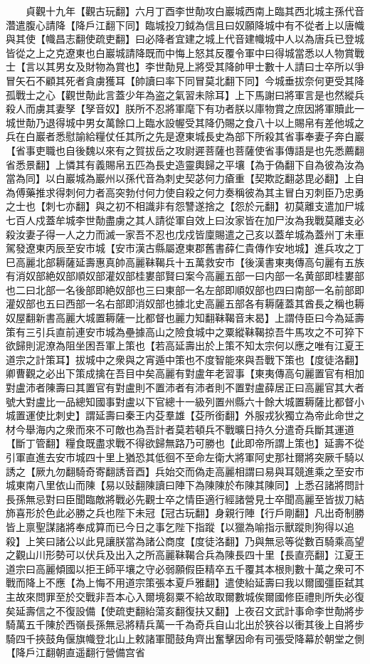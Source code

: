 　　貞觀十九年【觀古玩翻】六月丁酉李世勣攻白巖城西南上臨其西北城主孫代音濳遣腹心請降【降戶江翻下同】臨城投刀鉞為信且曰奴願降城中有不從者上以唐幟與其使【幟昌志翻使疏吏翻】曰必降者宜建之城上代音建幟城中人以為唐兵已登城皆從之上之克遼東也白巖城請降既而中悔上怒其反覆令軍中曰得城當悉以人物賞戰士【言以其男女及財物為賞也】李世勣見上將受其降帥甲士數十人請曰士卒所以爭冒矢石不顧其死者貪虜獲耳【帥讀曰率下同冒莫北翻下同】今城垂拔奈何更受其降孤戰士之心【觀世勣此言蓋少年為盗之氣習未除耳】上下馬謝曰將軍言是也然縱兵殺人而虜其妻孥【孥音奴】朕所不忍將軍麾下有功者朕以庫物賞之庶因將軍贖此一城世勣乃退得城中男女萬餘口上臨水設幄受其降仍賜之食八十以上賜帛有差他城之兵在白巖者悉慰諭給糧仗任其所之先是遼東城長史為部下所殺其省事奉妻子奔白巖【省事吏職也自後魏以來有之賀拔岳之攻尉遲菩薩也菩薩使省事傳語是也先悉薦翻省悉景翻】上憐其有義賜帛五匹為長史造靈輿歸之平壤【為于偽翻下自為彼為汝為當為同】以白巖城為巖州以孫代音為刺史契苾何力瘡重【契欺訖翻苾毘必翻】上自為傅藥推求得刺何力者高突勃付何力使自殺之何力奏稱彼為其主冒白刃刺臣乃忠勇之士也【刺七亦翻】與之初不相識非有怨讐遂捨之【怨於元翻】初莫離支遣加尸城七百人戍蓋牟城李世勣盡虜之其人請從軍自效上曰汝家皆在加尸汝為我戰莫離支必殺汝妻子得一人之力而滅一家吾不忍也戊戍皆廩賜遣之己亥以蓋牟城為蓋州丁未車駕發遼東丙辰至安市城【安市漢古縣屬遼東郡舊書薛仁貴傳作安地城】進兵攻之丁巳高麗北部耨薩延壽惠真帥高麗靺鞨兵十五萬救安市【後漢書東夷傳高句麗有五族有消奴部絶奴部順奴部灌奴部桂婁部賢曰案今高麗五部一曰内部一名黄部即桂婁部也二曰北部一名後部即絶奴部也三曰東部一名左部即順奴部也四曰南部一名前部即灌奴部也五曰西部一名右部即消奴部也據北史高麗五部各有耨薩蓋其酋長之稱也耨奴屋翻新書高麗大城置耨薩一比都督也麗力知翻靺鞨音末曷】上謂侍臣曰今為延壽策有三引兵直前連安市城為壘據高山之險食城中之粟縱靺鞨掠吾牛馬攻之不可猝下欲歸則泥潦為阻坐困吾軍上策也【若高延壽出於上策不知太宗何以應之唯有江夏王道宗之計策耳】拔城中之衆與之宵遁中策也不度智能來與吾戰下策也【度徒洛翻】卿曹觀之必出下策成擒在吾目中矣高麗有對盧年老習事【東夷傳高句麗置官有相加對盧沛者陳壽曰其置官有對盧則不置沛者有沛者則不置對盧薛居正曰高麗官其大者號大對盧比一品總知國事對盧以下官總十一級列置州縣六十餘大城置耨薩比都督小城置運使比刺史】謂延壽曰秦王内芟羣雄【芟所銜翻】外服戎狄獨立為帝此命世之材今舉海内之衆而來不可敵也為吾計者莫若頓兵不戰曠日持久分遣奇兵斷其運道【斷丁管翻】糧食既盡求戰不得欲歸無路乃可勝也【此即帝所謂上策也】延壽不從引軍直進去安市城四十里上猶恐其低徊不至命左衛大將軍阿史那社爾將突厥千騎以誘之【厥九勿翻騎奇寄翻誘音酉】兵始交而偽走高麗相謂曰易與耳競進乘之至安市城東南八里依山而陳【易以䜴翻陳讀曰陣下為陳陳於布陳其陳同】上悉召諸將問計長孫無忌對曰臣聞臨敵將戰必先觀士卒之情臣適行經諸營見士卒聞高麗至皆拔刀結斾喜形於色此必勝之兵也陛下未冠【冠古玩翻】身親行陣【行戶剛翻】凡出奇制勝皆上禀聖謀諸將奉成算而已今日之事乞陛下指蹤【以獵為喻指示獸蹤則狗得以追殺】上笑曰諸公以此見讓朕當為諸公商度【度徒洛翻】乃與無忌等從數百騎乘高望之觀山川形勢可以伏兵及出入之所高麗靺鞨合兵為陳長四十里【長直亮翻】江夏王道宗曰高麗傾國以拒王師平壤之守必弱願假臣精卒五千覆其本根則數十萬之衆可不戰而降上不應【為上悔不用道宗策張本夏戶雅翻】遣使紿延壽曰我以爾國彊臣弑其主故來問罪至於交戰非吾本心入爾境芻粟不給故取爾數城俟爾國修臣禮則所失必復矣延壽信之不復設備【使疏吏翻紿蕩亥翻復扶又翻】上夜召文武計事命李世勣將步騎萬五千陳於西嶺長孫無忌將精兵萬一千為奇兵自山北出於狹谷以衝其後上自將步騎四千挾鼓角偃旗幟登北山上敕諸軍聞鼓角齊出奮擊因命有司張受降幕於朝堂之側【降戶江翻朝直遥翻行營備宫省